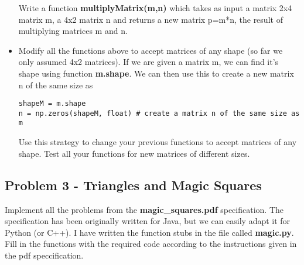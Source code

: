 \documentclass[11pt,a4paper]{report}
\begin{document}
\begin{itemize}
 Write a function \textbf{multiplyMatrix(m,n)} which takes as input a matrix 2x4 matrix m, a 4x2 matrix n and returns a new matrix p=m*n, the result of multiplying matrices m and n. 
 
 \item Modify all the functions above to accept matrices of any shape (so far we only assumed 4x2 matrices). If we are given a matrix m, we can find it's shape using function \textbf{m.shape}. We can then use this to create a new matrix n of the same size as 
 
 \begin{lstlisting}
shapeM = m.shape 
n = np.zeros(shapeM, float) # create a matrix n of the same size as m
\end{lstlisting}
 Use this strategy to change your previous functions to accept matrices of any shape. Test all your functions for new matrices of different sizes. 
 
 
\end{itemize}

\subsection*{Problem 3 - Triangles and Magic Squares}

Implement all the problems from the \textbf{magic\_squares.pdf} specification. The specification has been originally written for Java, but we can easily adapt it for Python (or C++). I have written the function stubs in the file called \textbf{magic.py}. Fill in the functions with the required code according to the instructions given in the pdf speccification. 
\end{document}
